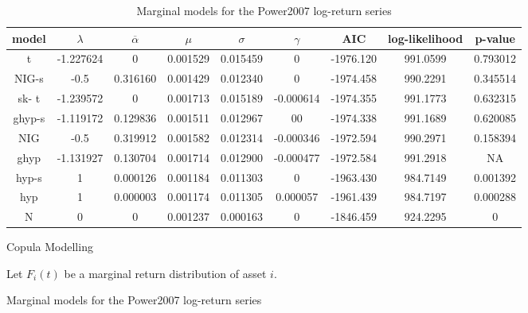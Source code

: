 \begin{figure}[htp]
{\tiny{}}
\begin{table}[ht]
{\tiny{\vspace{0.5cm}
 }}%
\begin{tabular}{c|c|c|c|c|c|c|c|c}
{\tiny{model}} & {\tiny{$\lambda$}} & {\tiny{$\overline{\alpha}$}} & {\tiny{$\mu$}} & {\tiny{$\sigma$}} & {\tiny{$\gamma$}} & {\tiny{AIC}} & {\tiny{log-likelihood}} & {\tiny{p-value}}\tabularnewline
\hline 
{\tiny{t}} & {\tiny{-1.227624}} & {\tiny{0}} & {\tiny{0.001529}} & {\tiny{0.015459}} & {\tiny{0}} & {\tiny{-1976.120}} & {\tiny{991.0599}} & {\tiny{0.793012}}\tabularnewline
{\tiny{NIG-s}} & {\tiny{-0.5}} & {\tiny{0.316160}} & {\tiny{0.001429}} & {\tiny{0.012340}} & {\tiny{0}} & {\tiny{-1974.458}} & {\tiny{990.2291}} & {\tiny{0.345514}}\tabularnewline
{\tiny{sk- t}} & {\tiny{-1.239572}} & {\tiny{0}} & {\tiny{0.001713}} & {\tiny{0.015189}} & {\tiny{-0.000614}} & {\tiny{-1974.355}} & {\tiny{991.1773}} & {\tiny{0.632315}}\tabularnewline
{\tiny{ghyp-s}} & {\tiny{-1.119172}} & {\tiny{0.129836}} & {\tiny{0.001511}} & {\tiny{0.012967}} & {\tiny{00}} & {\tiny{-1974.338}} & {\tiny{991.1689}} & {\tiny{0.620085}}\tabularnewline
{\tiny{NIG}} & {\tiny{-0.5}} & {\tiny{0.319912}} & {\tiny{0.001582}} & {\tiny{0.012314}} & {\tiny{-0.000346}} & {\tiny{-1972.594}} & {\tiny{990.2971}} & {\tiny{0.158394}}\tabularnewline
{\tiny{ghyp}} & {\tiny{-1.131927}} & {\tiny{0.130704}} & {\tiny{0.001714}} & {\tiny{0.012900}} & {\tiny{-0.000477}} & {\tiny{-1972.584}} & {\tiny{991.2918}} & {\tiny{NA}}\tabularnewline
{\tiny{hyp-s}} & {\tiny{1}} & {\tiny{0.000126}} & {\tiny{0.001184}} & {\tiny{0.011303}} & {\tiny{0}} & {\tiny{-1963.430}} & {\tiny{984.7149}} & {\tiny{0.001392}}\tabularnewline
{\tiny{hyp}} & {\tiny{1}} & {\tiny{0.000003}} & {\tiny{0.001174}} & {\tiny{0.011305}} & {\tiny{0.000057}} & {\tiny{-1961.439}} & {\tiny{984.7197}} & {\tiny{0.000288}}\tabularnewline
{\tiny{N }} & {\tiny{0}} & {\tiny{0}} & {\tiny{0.001237}} & {\tiny{0.000163}} & {\tiny{0}} & {\tiny{-1846.459}} & {\tiny{924.2295}} & {\tiny{0 }}\tabularnewline
\end{tabular}{\tiny{\caption{{\tiny{Marginal models for the Power2007 log-return series}}}
}}{\tiny \par}

{\tiny{%
 }}
\end{table}
{\tiny \par}

 \subsubsectionCopulas Copula Modelling

Let $F_{i}(t)$ be a marginal return distribution of asset $i$.


\end{figure}
